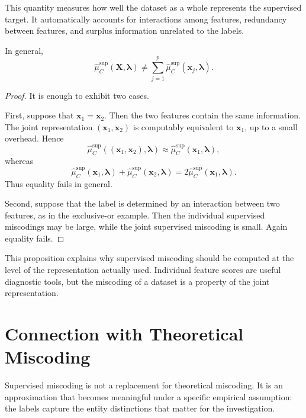 This quantity measures how well the dataset as a whole represents the supervised target. It automatically accounts for interactions among features, redundancy between features, and surplus information unrelated to the labels.

\begin{proposition}
\label{prop:dataset_not_sum_features}
In general,
\[
    \hat\mu_C^{\mathrm{sup}}(\mathbf X,\boldsymbol{\lambda})
    \neq
    \sum_{j=1}^p
    \hat\mu_C^{\mathrm{sup}}(\mathbf{x}_j,\boldsymbol{\lambda}).
\]
\end{proposition}

\begin{proof}
It is enough to exhibit two cases.

First, suppose that \(\mathbf{x}_1=\mathbf{x}_2\). Then the two features contain the same information. The joint representation \((\mathbf{x}_1,\mathbf{x}_2)\) is computably equivalent to \(\mathbf{x}_1\), up to a small overhead. Hence
\[
    \hat\mu_C^{\mathrm{sup}}((\mathbf{x}_1,\mathbf{x}_2),\boldsymbol{\lambda})
    \approx
    \hat\mu_C^{\mathrm{sup}}(\mathbf{x}_1,\boldsymbol{\lambda}),
\]
whereas
\[
    \hat\mu_C^{\mathrm{sup}}(\mathbf{x}_1,\boldsymbol{\lambda})
    +
    \hat\mu_C^{\mathrm{sup}}(\mathbf{x}_2,\boldsymbol{\lambda})
    =
    2\hat\mu_C^{\mathrm{sup}}(\mathbf{x}_1,\boldsymbol{\lambda}).
\]
Thus equality fails in general.

Second, suppose that the label is determined by an interaction between two features, as in the exclusive-or example. Then the individual supervised miscodings may be large, while the joint supervised miscoding is small. Again equality fails.
\end{proof}

This proposition explains why supervised miscoding should be computed at the level of the representation actually used. Individual feature scores are useful diagnostic tools, but the miscoding of a dataset is a property of the joint representation.

\section{Connection with Theoretical Miscoding}
\label{sec:supervised_theoretical_connection}

Supervised miscoding is not a replacement for theoretical miscoding. It is an approximation that becomes meaningful under a specific empirical assumption: the labels capture the entity distinctions that matter for the investigation.

